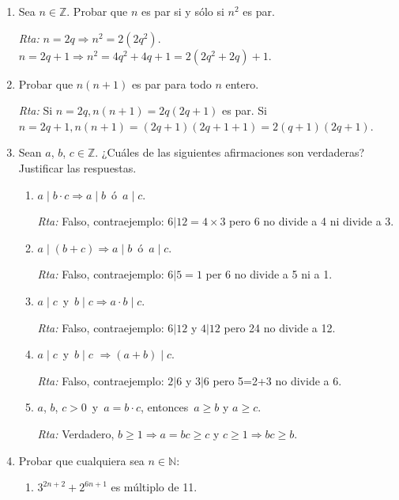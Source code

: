 \documentclass[a4paper,12pt,twoside,spanish,reqno]{amsbook}
\numberwithin{equation}{section}
\newcommand{\rta}{\noindent\textit{Rta: }}
\begin{document}
\begin{enumerate}
\item Sea $n\in \mathbb Z$. Probar que $n$ es par si y s\'olo si $n^2$ es par.

\rta $n=2q \Rightarrow n^2=2(2q^2)$. $n=2q+1\Rightarrow n^2=4q^2+4q+1=2(2q^2+2q)+1$.



\item Probar que $n(n+1)$ es par para todo $n$ entero.

\rta Si $ n=2q, n(n+1)=2q(2q+1)$ es par. Si $n=2q+1, n(n+1)=(2q+1)(2q+1+1)=2(q+1)(2q+1)$.



\item Sean $a$, $b$, $c \in {\mathbb Z}$. ¿Cuáles de las siguientes afirmaciones son verdaderas? Justificar las respuestas.
\begin{enumerate}
    \item $a \mid b\cdot c \Rightarrow a \mid b$\, \'o \,$a \mid c$.
    
    \rta Falso, contraejemplo: $6\vert12=4\times 3$ pero 6 no divide a 4 ni divide a 3.
    
    \item $a \mid (b+c) \Rightarrow a\mid b$\, \'o \,$a \mid c$.
    
    \rta Falso, contraejemplo: $6\vert 5=1$ per 6 no divide a 5 ni a 1.
    
    \item $a \mid c$\, y \,$b \mid c \Rightarrow a\cdot b \mid c$.
    
    \rta Falso, contraejemplo: $6\vert 12$ y $4\vert 12$ pero 24 no divide a 12.
    
    \item $a \mid c$\, y \,$b \mid c$ $\Rightarrow (a +b) \mid c$.
    
    \rta  Falso, contraejemplo: $2\vert 6$ y $3\vert 6$ pero 5=2+3 no divide a 6.
    
    \item $a$, $b$, $c>0$\, y \,$a=b\cdot c$, entonces  \,$a \ge b$ y $a \ge c$.
    
    \rta  Verdadero, $b\ge1 \Rightarrow a= bc\ge c$ y $ c\ge1 \Rightarrow bc\ge b$.
\end{enumerate}




\item Probar que cualquiera sea $n \in {\mathbb N}$:
\begin{enumerate}
    \item $3^{2n+2}+ 2^{6n+1}$ es múltiplo de 11.
    

\end{enumerate}
\end{enumerate}
\end{document}
